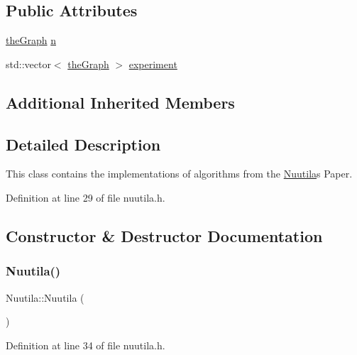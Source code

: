 \subsection*{Public Attributes}
\begin{DoxyCompactItemize}
\item 
\hyperlink{class_graph_component_a982e0748a6e1b8dc74986f5f8b3dca5c}{the\+Graph} \hyperlink{class_nuutila_a1409929fa0f38709497f8bdb012af71c}{n}
\item 
std\+::vector$<$ \hyperlink{class_graph_component_a982e0748a6e1b8dc74986f5f8b3dca5c}{the\+Graph} $>$ \hyperlink{class_nuutila_a70e8a910cc4050d246db2540bd1e36c5}{experiment}
\end{DoxyCompactItemize}
\subsection*{Additional Inherited Members}


\subsection{Detailed Description}
This class contains the implementations of algorithms from the \hyperlink{class_nuutila}{Nuutila}\textquotesingle{}s Paper. 

Definition at line 29 of file nuutila.\+h.



\subsection{Constructor \& Destructor Documentation}
\mbox{\label{class_nuutila_ab1ae0281145f693a922f5122d27cc23b}} 
\subsubsection{\texorpdfstring{Nuutila()}{Nuutila()}\hspace{0.1cm}{\footnotesize\ttfamily [1/2]}}
{\footnotesize\ttfamily Nuutila\+::\+Nuutila (\begin{DoxyParamCaption}{ }\end{DoxyParamCaption})\hspace{0.3cm}{\ttfamily [inline]}}



Definition at line 34 of file nuutila.\+h.


